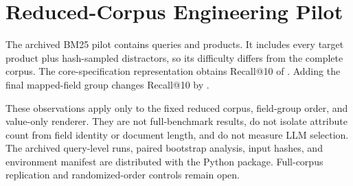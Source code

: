 \section{Reduced-Corpus Engineering Pilot}\label{sec:pilot}
The archived BM25 pilot contains \ResultPilotQueries{} queries and
\ResultPilotProducts{} products. It includes every target product plus
hash-sampled distractors, so its difficulty differs from the complete corpus.
The core-specification representation obtains Recall@10 of
\ResultCoreSpecsRecall{}. Adding the final mapped-field group changes
Recall@10 by \ResultFullMinusCoreRecall{}.

These observations apply only to the fixed reduced corpus, field-group order,
and value-only renderer. They are not full-benchmark results, do not isolate
attribute count from field identity or document length, and do not measure LLM
selection. The archived query-level runs, paired bootstrap analysis, input hashes,
and environment manifest are distributed with the Python package. Full-corpus
replication and randomized-order controls remain open.

